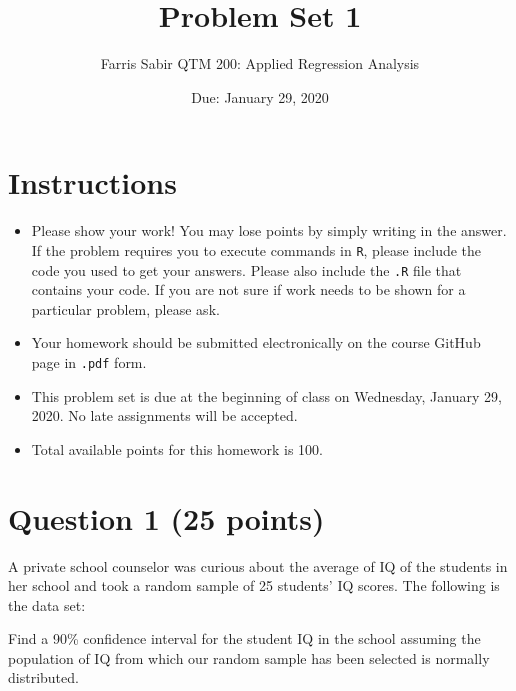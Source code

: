 \documentclass[12pt,letterpaper]{article}
\title{Problem Set 1}
\date{Due: January 29, 2020}
\author{Farris Sabir QTM 200: Applied Regression Analysis}
\begin{document}
	\maketitle
	
	\section*{Instructions}
	\begin{itemize}
		\item Please show your work! You may lose points by simply writing in the answer. If the problem requires you to execute commands in \texttt{R}, please include the code you used to get your answers. Please also include the \texttt{.R} file that contains your code. If you are not sure if work needs to be shown for a particular problem, please ask.
		\item Your homework should be submitted electronically on the course GitHub page in \texttt{.pdf} form.
		\item This problem set is due at the beginning of class on Wednesday, January 29, 2020. No late assignments will be accepted.
		\item Total available points for this homework is 100.
	\end{itemize}
	
	\vspace{1cm}
	\section*{Question 1 (25 points)}

A private school counselor was curious about the average of IQ of the students in her school and took a random sample of 25 students' IQ scores. The following is the data set:
\vspace{.5cm}

  

\vspace{.5cm}

\noindent Find a 90\% confidence interval for the student IQ in the school assuming the population of IQ from which our random sample has been selected is normally distributed. 

\vspace{.5cm}

  

\vspace{.5cm}
\end{document}

